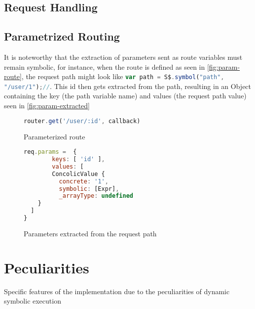 \subsection{Request Handling}
\label{sec:req-handling}


\subsection{Parametrized Routing}
It is noteworthy that the extraction of parameters sent as route variables must remain symbolic, for instance, when the route is defined as seen in \autoref{fig:param-route}, the request path might look like \lstinline[language=JavaScript, gobble=4]{var path = S$.symbol("path", "/user/1");//}. This id then gets extracted from the path, resulting in an Object containing the key (the path variable name) and values (the request path value) seen in \autoref{fig:param-extracted}

\begin{figure}[ht]
    \begin{lstlisting}[language=JavaScript, gobble=4]
    router.get('/user/:id', callback) 
    \end{lstlisting}
    \caption{Parameterized route}
    \label{fig:param-route}
\end{figure}




\begin{figure}[ht]
    \begin{lstlisting}[language=JavaScript, gobble=4]
     req.params =  {
        keys: [ 'id' ],
        values: [
        ConcolicValue {
          concrete: '1',
          symbolic: [Expr],
          _arrayType: undefined
    }
  ]
}
    \end{lstlisting}
    \caption{Parameters extracted from the request path}
    \label{fig:param-extracted}
\end{figure}




\section{Peculiarities}
\label{sec:peculiarities}
Specific features of the implementation due to the peculiarities of dynamic symbolic execution

